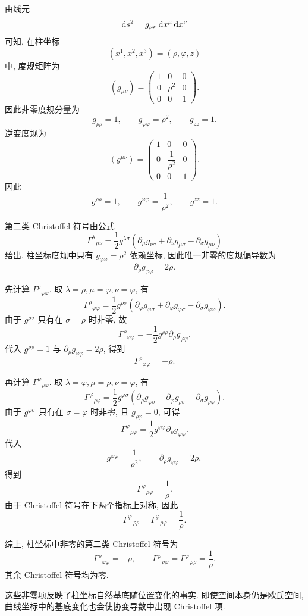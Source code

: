 \begin{solution}
	由线元
	\[
	\mathop{}\!\mathrm{d} s^{2}
	=
	g_{\mu\nu}\mathop{}\!\mathrm{d} x^{\mu}\mathop{}\!\mathrm{d} x^{\nu}
	\]
	可知, 在柱坐标
	\[
	(x^{1},x^{2},x^{3})=(\rho,\varphi,z)
	\]
	中, 度规矩阵为
	\[
	(g_{\mu\nu})
	=
	\begin{pmatrix}
		1&0&0\\
		0&\rho^{2}&0\\
		0&0&1
	\end{pmatrix}.
	\]
	因此非零度规分量为
	\[
	g_{\rho\rho}=1,
	\qquad
	g_{\varphi\varphi}=\rho^{2},
	\qquad
	g_{zz}=1.
	\]
	逆变度规为
	\[
	(g^{\mu\nu})
	=
	\begin{pmatrix}
		1&0&0\\
		0&\dfrac{1}{\rho^{2}}&0\\
		0&0&1
	\end{pmatrix}.
	\]
	因此
	\[
	g^{\rho\rho}=1,
	\qquad
	g^{\varphi\varphi}=\frac{1}{\rho^{2}},
	\qquad
	g^{zz}=1.
	\]
	
	第二类 Christoffel 符号由公式
	\[
	\Gamma^{\lambda}{}_{\mu\nu}
	=
	\frac{1}{2}g^{\lambda\sigma}
	\left(
	\partial_{\mu}g_{\nu\sigma}
	+
	\partial_{\nu}g_{\mu\sigma}
	-
	\partial_{\sigma}g_{\mu\nu}
	\right)
	\]
	给出. 柱坐标度规中只有 $g_{\varphi\varphi}=\rho^{2}$ 依赖坐标, 因此唯一非零的度规偏导数为
	\[
	\partial_{\rho}g_{\varphi\varphi}
	=
	2\rho.
	\]
	
	先计算 $\Gamma^{\rho}{}_{\varphi\varphi}$. 取 $\lambda=\rho,\mu=\varphi,\nu=\varphi$, 有
	\[
	\Gamma^{\rho}{}_{\varphi\varphi}
	=
	\frac{1}{2}g^{\rho\sigma}
	\left(
	\partial_{\varphi}g_{\varphi\sigma}
	+
	\partial_{\varphi}g_{\varphi\sigma}
	-
	\partial_{\sigma}g_{\varphi\varphi}
	\right).
	\]
	由于 $g^{\rho\sigma}$ 只有在 $\sigma=\rho$ 时非零, 故
	\[
	\Gamma^{\rho}{}_{\varphi\varphi}
	=
	-\frac{1}{2}g^{\rho\rho}\partial_{\rho}g_{\varphi\varphi}.
	\]
	代入 $g^{\rho\rho}=1$ 与 $\partial_{\rho}g_{\varphi\varphi}=2\rho$, 得到
	\[
	\Gamma^{\rho}{}_{\varphi\varphi}
	=
	-\rho.
	\]
	
	再计算 $\Gamma^{\varphi}{}_{\rho\varphi}$. 取 $\lambda=\varphi,\mu=\rho,\nu=\varphi$, 有
	\[
	\Gamma^{\varphi}{}_{\rho\varphi}
	=
	\frac{1}{2}g^{\varphi\sigma}
	\left(
	\partial_{\rho}g_{\varphi\sigma}
	+
	\partial_{\varphi}g_{\rho\sigma}
	-
	\partial_{\sigma}g_{\rho\varphi}
	\right).
	\]
	由于 $g^{\varphi\sigma}$ 只有在 $\sigma=\varphi$ 时非零, 且 $g_{\rho\varphi}=0$, 可得
	\[
	\Gamma^{\varphi}{}_{\rho\varphi}
	=
	\frac{1}{2}g^{\varphi\varphi}\partial_{\rho}g_{\varphi\varphi}.
	\]
	代入
	\[
	g^{\varphi\varphi}=\frac{1}{\rho^{2}},
	\qquad
	\partial_{\rho}g_{\varphi\varphi}=2\rho,
	\]
	得到
	\[
	\Gamma^{\varphi}{}_{\rho\varphi}
	=
	\frac{1}{\rho}.
	\]
	由于 Christoffel 符号在下两个指标上对称, 因此
	\[
	\Gamma^{\varphi}{}_{\varphi\rho}
	=
	\Gamma^{\varphi}{}_{\rho\varphi}
	=
	\frac{1}{\rho}.
	\]
	
	综上, 柱坐标中非零的第二类 Christoffel 符号为
	\[
	\Gamma^{\rho}{}_{\varphi\varphi}
	=
	-\rho,
	\qquad
	\Gamma^{\varphi}{}_{\rho\varphi}
	=
	\Gamma^{\varphi}{}_{\varphi\rho}
	=
	\frac{1}{\rho}.
	\]
	其余 Christoffel 符号均为零. 
	
	这些非零项反映了柱坐标自然基底随位置变化的事实. 即使空间本身仍是欧氏空间, 曲线坐标中的基底变化也会使协变导数中出现 Christoffel 项. 
\end{solution}

